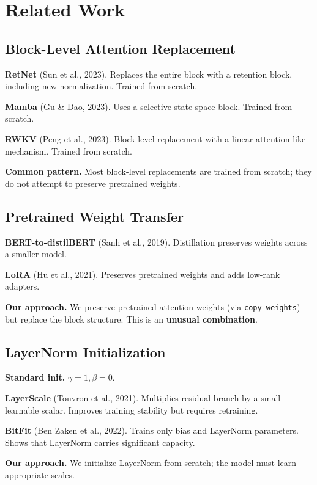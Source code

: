 
\section{Related Work}

\subsection{Block-Level Attention Replacement}

\textbf{RetNet} (Sun et al., 2023). Replaces the entire block with a retention 
block, including new normalization. Trained from scratch.

\textbf{Mamba} (Gu \& Dao, 2023). Uses a selective state-space block. Trained from 
scratch.

\textbf{RWKV} (Peng et al., 2023). Block-level replacement with a linear 
attention-like mechanism. Trained from scratch.

\textbf{Common pattern.} Most block-level replacements are trained from scratch; 
they do not attempt to preserve pretrained weights.

\subsection{Pretrained Weight Transfer}

\textbf{BERT-to-distilBERT} (Sanh et al., 2019). Distillation preserves weights 
across a smaller model.

\textbf{LoRA} (Hu et al., 2021). Preserves pretrained weights and adds low-rank 
adapters.

\textbf{Our approach.} We preserve pretrained attention weights (via \texttt{copy\_weights}) 
but replace the block structure. This is an \textbf{unusual combination}.

\subsection{LayerNorm Initialization}

\textbf{Standard init.} $\gamma = 1, \beta = 0$.

\textbf{LayerScale} (Touvron et al., 2021). Multiplies residual branch by a small 
learnable scalar. Improves training stability but requires retraining.

\textbf{BitFit} (Ben Zaken et al., 2022). Trains only bias and LayerNorm 
parameters. Shows that LayerNorm carries significant capacity.

\textbf{Our approach.} We initialize LayerNorm from scratch; the model must learn 
appropriate scales.

